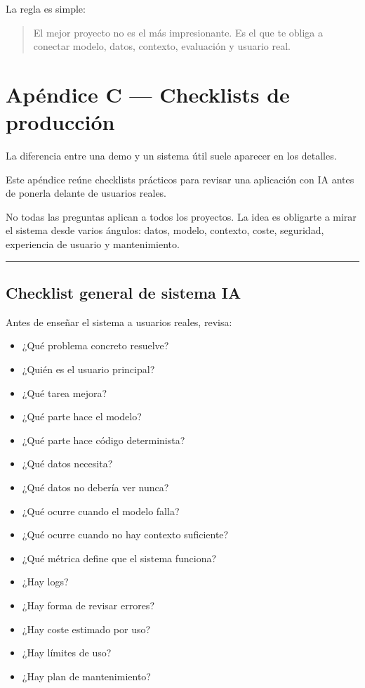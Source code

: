 La regla es simple:

\begin{quote}
El mejor proyecto no es el más impresionante. Es el que te obliga a
conectar modelo, datos, contexto, evaluación y usuario real.
\end{quote}

\newpage

\chapter{Apéndice C --- Checklists de
producción}\label{apuxe9ndice-c-checklists-de-producciuxf3n}

La diferencia entre una demo y un sistema útil suele aparecer en los
detalles.

Este apéndice reúne checklists prácticos para revisar una aplicación con
IA antes de ponerla delante de usuarios reales.

No todas las preguntas aplican a todos los proyectos. La idea es
obligarte a mirar el sistema desde varios ángulos: datos, modelo,
contexto, coste, seguridad, experiencia de usuario y mantenimiento.

\begin{center}\rule{0.5\linewidth}{0.5pt}\end{center}

\section{Checklist general de sistema
IA}\label{checklist-general-de-sistema-ia}

Antes de enseñar el sistema a usuarios reales, revisa:

\begin{itemize}
\tightlist
\item
  ¿Qué problema concreto resuelve?
\item
  ¿Quién es el usuario principal?
\item
  ¿Qué tarea mejora?
\item
  ¿Qué parte hace el modelo?
\item
  ¿Qué parte hace código determinista?
\item
  ¿Qué datos necesita?
\item
  ¿Qué datos no debería ver nunca?
\item
  ¿Qué ocurre cuando el modelo falla?
\item
  ¿Qué ocurre cuando no hay contexto suficiente?
\item
  ¿Qué métrica define que el sistema funciona?
\item
  ¿Hay logs?
\item
  ¿Hay forma de revisar errores?
\item
  ¿Hay coste estimado por uso?
\item
  ¿Hay límites de uso?
\item
  ¿Hay plan de mantenimiento?
\end{itemize}

